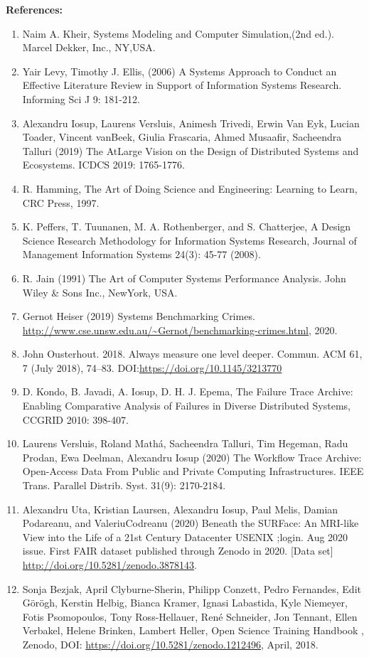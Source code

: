 \documentclass{article}
\begin{document}
\noindent\textbf{References:}
\begin{enumerate}
    \item Naim A. Kheir, Systems Modeling and Computer Simulation,(2nd ed.). Marcel Dekker, Inc., NY,USA.
    \item Yair Levy, Timothy J. Ellis, (2006) A Systems Approach to Conduct an Effective Literature Review in Support of Information Systems Research. Informing Sci J 9: 181-212.
    \item Alexandru Iosup, Laurens Versluis, Animesh Trivedi, Erwin Van Eyk, Lucian Toader, Vincent vanBeek, Giulia Frascaria, Ahmed Musaafir, Sacheendra Talluri (2019) The AtLarge Vision on the Design of Distributed Systems and Ecosystems. ICDCS 2019: 1765-1776.
    \item R. Hamming, The Art of Doing Science and Engineering: Learning to Learn, CRC Press, 1997.
    \item K. Peffers, T. Tuunanen, M. A. Rothenberger, and S. Chatterjee, A Design Science Research Methodology for Information Systems Research, Journal of Management Information Systems 24(3): 45-77 (2008).
    \item R. Jain (1991) The Art of Computer Systems Performance Analysis. John Wiley \& Sons Inc., NewYork, USA.
    \item Gernot Heiser (2019) Systems Benchmarking Crimes. \url{http://www.cse.unsw.edu.au/~Gernot/benchmarking-crimes.html}, 2020. 
    \item John Ousterhout. 2018. Always measure one level deeper. Commun. ACM 61, 7 (July 2018), 74–83. DOI:\url{https://doi.org/10.1145/3213770}
    \item D. Kondo, B. Javadi, A. Iosup, D. H. J. Epema, The Failure Trace Archive: Enabling Comparative Analysis of Failures in Diverse Distributed Systems, CCGRID 2010: 398-407.
    \item Laurens Versluis, Roland Mathá, Sacheendra Talluri, Tim Hegeman, Radu Prodan, Ewa Deelman, Alexandru Iosup (2020) The Workflow Trace Archive: Open-Access Data From Public and Private Computing Infrastructures. IEEE Trans. Parallel Distrib. Syst. 31(9): 2170-2184.
    \item Alexandru Uta, Kristian Laursen, Alexandru Iosup, Paul Melis, Damian Podareanu, and ValeriuCodreanu (2020) Beneath the SURFace: An MRI-like View into the Life of a 21st Century Datacenter USENIX ;login. Aug 2020 issue. First FAIR dataset published through Zenodo in 2020.  [Data set] \url{http://doi.org/10.5281/zenodo.3878143}.
    \item Sonja Bezjak, April Clyburne-Sherin, Philipp Conzett, Pedro Fernandes, Edit Görögh, Kerstin Helbig, Bianca Kramer, Ignasi Labastida, Kyle Niemeyer, Fotis Psomopoulos, Tony Ross-Hellauer, René Schneider, Jon Tennant, Ellen Verbakel, Helene Brinken, Lambert Heller, Open Science Training Handbook , Zenodo, DOI: \url{https://doi.org/10.5281/zenodo.1212496}, April, 2018.

\end{enumerate}
\end{document}
